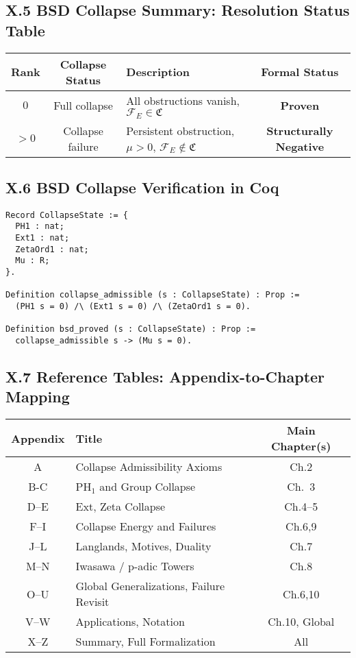 \documentclass[11pt]{article}
\begin{document}
\subsection*{X.5 BSD Collapse Summary: Resolution Status Table}

\begin{center}
\begin{tabular}{|c|c|l|c|}
\hline
\textbf{Rank} & \textbf{Collapse Status} & \textbf{Description} & \textbf{Formal Status} \\
\hline
\( 0 \) & Full collapse & All obstructions vanish, \( \mathcal{F}_E \in \mathfrak{C} \) & \textbf{Proven} \\
\( > 0 \) & Collapse failure & Persistent obstruction, \(\mu > 0\), \( \mathcal{F}_E \notin \mathfrak{C} \) & \textbf{Structurally Negative} \\
\hline
\end{tabular}
\end{center}

\subsection*{X.6 BSD Collapse Verification in Coq}

\begin{lstlisting}[language=Coq]
Record CollapseState := {
  PH1 : nat;
  Ext1 : nat;
  ZetaOrd1 : nat;
  Mu : R;
}.

Definition collapse_admissible (s : CollapseState) : Prop :=
  (PH1 s = 0) /\ (Ext1 s = 0) /\ (ZetaOrd1 s = 0).

Definition bsd_proved (s : CollapseState) : Prop :=
  collapse_admissible s -> (Mu s = 0).
\end{lstlisting}

\subsection*{X.7 Reference Tables: Appendix-to-Chapter Mapping}

\begin{center}
\begin{tabular}{|c|l|c|}
\hline
\textbf{Appendix} & \textbf{Title} & \textbf{Main Chapter(s)} \\
\hline
A & Collapse Admissibility Axioms & Ch.2 \\
B-C & \( \mathrm{PH}_1 \) and Group Collapse & Ch.~3 \\
D–E & Ext, Zeta Collapse & Ch.4–5 \\
F–I & Collapse Energy and Failures & Ch.6,9 \\
J–L & Langlands, Motives, Duality & Ch.7 \\
M–N & Iwasawa / p-adic Towers & Ch.8 \\
O–U & Global Generalizations, Failure Revisit & Ch.6,10 \\
V–W & Applications, Notation & Ch.10, Global \\
X–Z & Summary, Full Formalization & All \\
\hline
\end{tabular}
\end{center}
\end{document}
